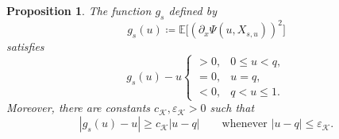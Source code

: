 \documentclass[11pt]{article}
\newtheorem{proposition}[theorem]{Proposition}
\numberwithin{equation}{section}
\newcommand{\E}{\mathbb{E}}
\newcommand{\1}{\mathbf 1}
\newcommand{\cK}{\mathcal K}
\begin{document}
\begin{proposition}
\label{prop:pathRS}
The function $g_s$ defined by
\begin{equation}
 g_s(u)\coloneqq\E\bigl[(\partial_x\Psi(u,X_{s,u}))^2\bigr]
 \label{eq:gs-def}
\end{equation}
satisfies
\begin{equation}
 g_s(u)-u
 \begin{cases}
 >0,&0\le u<q,\\
 =0,&u=q,\\
 <0,&q<u\le1.
 \end{cases}
 \label{eq:ATsign}
\end{equation}
Moreover, there are constants $c_{\cK},\varepsilon_{\cK}>0$ such that
\begin{equation}
 |g_s(u)-u|\ge c_{\cK}|u-q|
 \qquad\text{whenever }|u-q|\le\varepsilon_{\cK}.
 \label{eq:linearATsign}
\end{equation}
\end{proposition}
\end{document}
